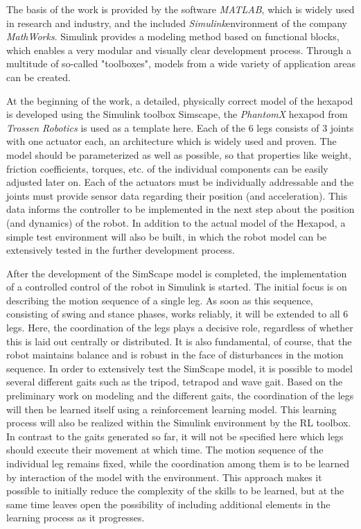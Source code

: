 The basis of the work is provided by the software \textit{MATLAB\textregistered}, which is widely used in research and industry, and the included \textit{Simulink}\textregistered environment of the company \textit{MathWorks}.
Simulink provides a modeling method based on functional blocks, which enables a very modular and visually clear development process.
Through a multitude of so-called "toolboxes", models from a wide variety of application areas can be created.

At the beginning of the work, a detailed, physically correct model of the hexapod is developed using the Simulink toolbox Simscape, the \emph{PhantomX} hexapod from \emph{Trossen Robotics} is used as a template here.
Each of the 6 legs consists of 3 joints with one actuator each, an architecture which is widely used and proven.
The model should be parameterized as well as possible, so that properties like weight, friction coefficients, torques, etc. of the individual components can be easily adjusted later on.
Each of the actuators must be individually addressable and the joints must provide sensor data regarding their position (and acceleration).
This data informs the controller to be implemented in the next step about the position (and dynamics) of the robot.
In addition to the actual model of the Hexapod, a simple test environment will also be built, in which the robot model can be extensively tested in the further development process.

After the development of the SimScape model is completed, the implementation of a controlled control of the robot in Simulink is started.
The initial focus is on describing the motion sequence of a single leg.
As soon as this sequence, consisting of swing and stance phases, works reliably, it will be extended to all 6 legs.
Here, the coordination of the legs plays a decisive role, regardless of whether this is laid out centrally or distributed.
It is also fundamental, of course, that the robot maintains balance and is robust in the face of disturbances in the motion sequence.
In order to extensively test the SimScape model, it is possible to model several different gaits such as the tripod, tetrapod and wave gait.
Based on the preliminary work on modeling and the different gaits, the coordination of the legs will then be learned itself using a reinforcement learning model.
This learning process will also be realized within the Simulink environment by the RL toolbox.
In contrast to the gaits generated so far, it will not be specified here which legs should execute their movement at which time.
The motion sequence of the individual leg remains fixed, while the coordination among them is to be learned by interaction of the model with the environment. 
This approach makes it possible to initially reduce the complexity of the skills to be learned, but at the same time leaves open the possibility of including additional elements in the learning process as it progresses.

